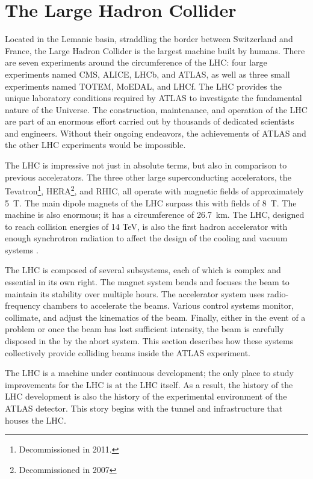 \section{The Large Hadron Collider}

Located in the Lemanic basin, straddling the border between Switzerland and France, the Large Hadron Collider is the largest machine built by humans.
There are seven experiments around the circumference of the LHC: four large experiments named CMS, ALICE, LHCb, and ATLAS, as well as three small experiments named TOTEM, MoEDAL, and LHCf.
The LHC provides the unique laboratory conditions required by ATLAS to investigate the fundamental nature of the Universe.
The construction, maintenance, and operation of the LHC are part of an enormous effort carried out by thousands of dedicated scientists and engineers.
Without their ongoing endeavors, the achievements of ATLAS and the other LHC experiments would be impossible.

The LHC is impressive not just in absolute terms, but also in comparison to previous accelerators.
The three other large superconducting accelerators, the Tevatron\footnote{Decommissioned in 2011.}, HERA\footnote{Decommissioned in 2007}, and RHIC, all operate with magnetic fields of approximately 5~T.
The main dipole magnets of the LHC surpass this with fields of 8~T.
The machine is also enormous; it has a circumference of 26.7~km.
The LHC, designed to reach collision energies of 14 TeV, is also the first hadron accelerator with enough synchrotron radiation to affect the design of the cooling and vacuum systems \cite{lyndon}.

The LHC is composed of several subsystems, each of which is complex and essential in its own right.
The magnet system bends and focuses the beam to maintain its stability over multiple hours.
The accelerator system uses radio-frequency chambers to accelerate the beams.
Various control systems monitor, collimate, and adjust the kinematics of the beam.
Finally, either in the event of a problem or once the beam has lost sufficient intensity, the beam is carefully disposed in the by the abort system.
This section describes how these systems collectively provide colliding beams inside the ATLAS experiment.

The LHC is a machine under continuous development; the only place to study improvements for the LHC is at the LHC itself.
As a result, the history of the LHC development is also the history of the experimental environment of the ATLAS detector.
This story begins with the tunnel and infrastructure that houses the LHC.

